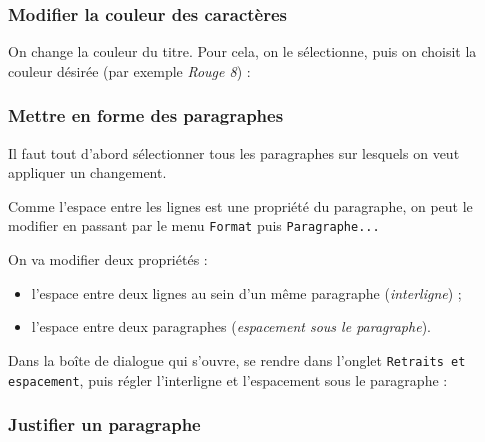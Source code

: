 \subsubsection{Modifier la couleur des caractères} 


On change la couleur du titre. Pour cela, on le sélectionne, puis on choisit la couleur désirée (par exemple \emph{Rouge 8}) :











\subsubsection{Mettre en forme des paragraphes} 



Il faut tout d'abord sélectionner tous les paragraphes sur lesquels on veut appliquer un changement.

Comme l'espace entre les lignes est une propriété du paragraphe, on peut le modifier en passant par le menu \texttt{Format} puis \texttt{Paragraphe...}

On va modifier deux propriétés : 
\begin{itemize}
\item l'espace entre deux lignes au sein d'un même paragraphe (\emph{interligne}) ;
\item l'espace entre deux paragraphes (\emph{espacement sous le paragraphe}).
\end{itemize}



Dans la boîte de dialogue qui s'ouvre, se rendre dans l'onglet \texttt{Retraits et espacement}, puis régler l'interligne et l'espacement sous le paragraphe :  








\subsubsection{Justifier un paragraphe}

